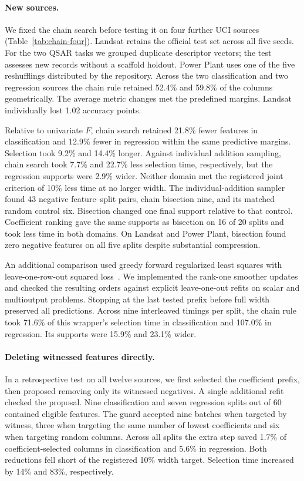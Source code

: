 \paragraph{New sources.}
We fixed the chain search before testing it on four further UCI sources
(Table~\ref{tab:chain-four}). Landsat retains the official test set across
all five seeds. For the two QSAR tasks we grouped duplicate descriptor vectors;
the test assesses new records without a scaffold holdout. Power Plant uses
one of the five reshufflings distributed by the repository. Across the two
classification and two regression sources the chain rule retained 52.4\%
and 59.8\% of the columns geometrically. The average metric changes met the
predefined margins. Landsat individually lost 1.02 accuracy points.

Relative to univariate $F$, chain search retained 21.8\% fewer features in
classification and 12.9\% fewer in regression within the same predictive
margins. Selection took 9.2\% and 14.4\% longer. Against individual
addition sampling, chain search took 7.7\% and 22.7\% less selection time,
respectively, but the regression supports were 2.9\% wider. Neither domain
met the registered joint criterion of 10\% less time at no larger width.
The individual-addition sampler found 43 negative feature--split pairs,
chain bisection nine, and its matched random control six. Bisection changed
one final support relative to that control. Coefficient ranking gave the
same supports as bisection on 16 of 20 splits and took less time in both
domains. On Landsat and Power Plant, bisection found zero negative features
on all five splits despite substantial compression.

An additional comparison used greedy forward regularized least squares
with leave-one-row-out squared loss~\cite{pahikkala2010rls}. We implemented
the rank-one smoother updates and checked the resulting orders against explicit
leave-one-out refits on scalar and multioutput problems. Stopping at the
last tested prefix before full width preserved all predictions. Across nine
interleaved timings per split, the chain rule took 71.6\% of this wrapper's
selection time in classification and 107.0\% in regression. Its supports
were 15.9\% and 23.1\% wider.

\paragraph{Deleting witnessed features directly.}
In a retrospective test on all twelve sources, we first selected the coefficient
prefix, then proposed removing only its witnessed negatives. A single additional
refit checked the proposal. Nine classification and seven regression splits
out of 60 contained eligible features.
The guard accepted nine batches when targeted by witness, three when targeting
the same number of lowest coefficients and six when targeting random columns.
Across all splits the extra step saved 1.7\% of coefficient-selected columns
in classification and 5.6\% in regression. Both reductions fell short of the
registered 10\% width target. Selection time increased by 14\% and 83\%, respectively.

